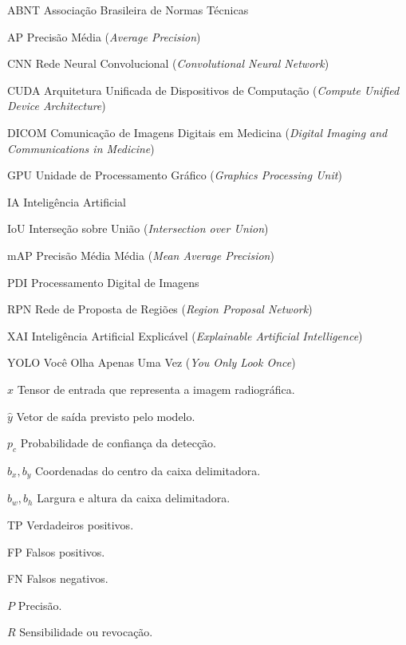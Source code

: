 \documentclass[12pt,oneside,a4paper,chapter=TITLE,section=TITLE,sumario=tradicional]{abntex2}
\begin{document}
\begin{siglas}
  \item[ABNT] Associação Brasileira de Normas Técnicas
  \item[AP] Precisão Média (\textit{Average Precision})
  \item[CNN] Rede Neural Convolucional (\textit{Convolutional Neural Network})
  \item[CUDA] Arquitetura Unificada de Dispositivos de Computação (\textit{Compute Unified Device Architecture})
  \item[DICOM] Comunicação de Imagens Digitais em Medicina (\textit{Digital Imaging and Communications in Medicine})
  \item[GPU] Unidade de Processamento Gráfico (\textit{Graphics Processing Unit})
  \item[IA] Inteligência Artificial
  \item[IoU] Interseção sobre União (\textit{Intersection over Union})
  \item[mAP] Precisão Média Média (\textit{Mean Average Precision})
  \item[PDI] Processamento Digital de Imagens
  \item[RPN] Rede de Proposta de Regiões (\textit{Region Proposal Network})
  \item[XAI] Inteligência Artificial Explicável (\textit{Explainable Artificial Intelligence})
  \item[YOLO] Você Olha Apenas Uma Vez (\textit{You Only Look Once})
\end{siglas}

\begin{simbolos}
  \item[$x$] Tensor de entrada que representa a imagem radiográfica.
  \item[$\hat{y}$] Vetor de saída previsto pelo modelo.
  \item[$p_c$] Probabilidade de confiança da detecção.
  \item[$b_x, b_y$] Coordenadas do centro da caixa delimitadora.
  \item[$b_w, b_h$] Largura e altura da caixa delimitadora.
  \item[TP] Verdadeiros positivos.
  \item[FP] Falsos positivos.
  \item[FN] Falsos negativos.
  \item[$P$] Precisão.
  \item[$R$] Sensibilidade ou revocação.
\end{simbolos}
\end{document}
